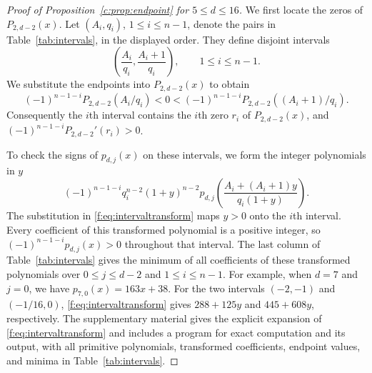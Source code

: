 \documentclass[11pt]{article}
\numberwithin{equation}{section}
\theoremstyle{remark}\newtheorem{remark}[theorem]{Remark}
\begin{document}
\begin{proof}[Proof of Proposition~\ref{c:prop:endpoint} for $5\le d\le16$]
We first locate the zeros of $P_{2,d-2}(x)$. Let $(A_i,q_i)$,
$1\le i\le n-1$, denote the pairs in Table~\ref{tab:intervals},
in the displayed order. They define disjoint intervals
\[
 \left(\frac{A_i}{q_i},\frac{A_i+1}{q_i}\right),
 \qquad 1\le i\le n-1.
\]
We substitute the endpoints into $P_{2,d-2}(x)$ to obtain
\begin{equation*}
 (-1)^{n-1-i}P_{2,d-2}(A_i/q_i)<0<
 (-1)^{n-1-i}P_{2,d-2}((A_i+1)/q_i).
\end{equation*}
Consequently the $i$th interval contains the $i$th zero $r_i$ of $P_{2,d-2}(x)$, and
$(-1)^{n-1-i}P_{2,d-2}'(r_i)>0$.

To check the signs of $p_{d,j}(x)$ on these intervals, we form the integer polynomials in $y$
\begin{equation}\label{f:eq:intervaltransform}
 (-1)^{n-1-i} q_i^{n-2}(1+y)^{n-2}
 p_{d,j}\!\left(\frac{A_i+(A_i+1)y}{q_i(1+y)}\right).
\end{equation}
The substitution in \eqref{f:eq:intervaltransform} maps $y>0$ onto
the $i$th interval. Every coefficient of this transformed polynomial is a positive
integer, so $(-1)^{n-1-i}p_{d,j}(x)>0$ throughout that interval.
The last column of Table~\ref{tab:intervals} gives the minimum of all
coefficients of these transformed polynomials over $0\le j\le d-2$ and $1\le i\le n-1$.
For example, when $d=7$ and $j=0$, we have $p_{7,0}(x)=163x+38$.
For the two intervals $(-2,-1)$ and $(-1/16,0)$,
\eqref{f:eq:intervaltransform} gives $288+125y$ and $445+608y$,
respectively. The supplementary material gives the explicit expansion of
\eqref{f:eq:intervaltransform} and includes a program for exact computation
and its output, with all primitive polynomials, transformed coefficients,
endpoint values, and minima in Table~\ref{tab:intervals}.


\end{proof}
\end{document}
